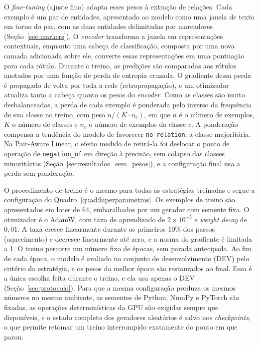 O \emph{fine-tuning} (ajuste fino) adapta esses pesos à extração de relações.
Cada exemplo é um par de entidades, apresentado ao modelo como uma janela de texto em
torno do par, com as duas entidades delimitadas por marcadores
(Seção~\ref{sec:markers}). O \emph{encoder} transforma a janela em representações contextuais, enquanto uma cabeça de classificação, composta por uma nova camada adicionada sobre ele, converte essas representações em uma pontuação para cada rótulo. Durante o
treino, as predições são comparadas aos rótulos anotados por uma função de perda de
entropia cruzada. O gradiente dessa perda é propagado de volta por toda a rede
(retropropagação), e um otimizador atualiza tanto a cabeça quanto os pesos do
\emph{encoder}. Como as classes são muito desbalanceadas, a perda de cada exemplo é
ponderada pelo inverso da frequência de sua classe no treino, com peso
$n/(K\cdot n_c)$, em que $n$ é o número de exemplos, $K$ o número de classes e $n_c$
o número de exemplos da classe $c$. A ponderação compensa a tendência do modelo de
favorecer \texttt{no\_relation}, a classe majoritária. Na Pair-Aware Linear, o
efeito medido de retirá-la foi deslocar o ponto de operação de \texttt{negation\_of}
em direção à precisão, sem colapso das classes minoritárias
(Seção~\ref{sec:resultados_sem_pesos}), e a configuração final usa a perda sem
ponderação.

O procedimento de treino é o mesmo para todas as estratégias treinadas e segue a
configuração do Quadro~\ref{quad:hiperparametros}. Os exemplos de treino são
apresentados em lotes de 64, embaralhados por um gerador com semente fixa. O
otimizador é o AdamW, com taxa de aprendizado de $2\times10^{-5}$ e
\emph{weight decay} de $0{,}01$. A taxa cresce linearmente durante os primeiros 10\%
dos passos (aquecimento) e decresce linearmente até zero, e a norma do gradiente é
limitada a 1. O treino percorre um número fixo de épocas, sem parada
antecipada. Ao fim de cada época, o modelo é avaliado no conjunto de desenvolvimento
(DEV) pelo critério da estratégia, e os pesos da melhor época são restaurados ao
final. Essa é a única escolha feita durante o treino, e ela usa apenas o DEV
(Seção~\ref{sec:protocolo}). Para que a mesma configuração produza os mesmos números
no mesmo ambiente, as sementes de Python, NumPy e PyTorch são fixadas, as operações
determinísticas da GPU são exigidas sempre que disponíveis, e o estado completo dos
geradores aleatórios é salvo nos \emph{checkpoints}, o que permite retomar um treino
interrompido exatamente do ponto em que parou.

